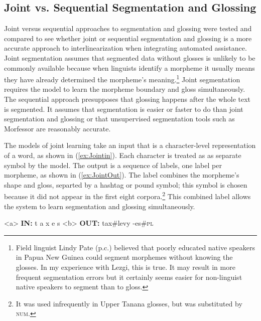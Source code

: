 

\subsection{Joint vs. Sequential Segmentation and Glossing}
\label{sec:sgjoint}

Joint versus sequential approaches to segmentation and glossing were tested and compared to see whether joint or sequential segmentation and glossing is a more accurate approach to interlinearization when integrating automated assistance. Joint segmentation assumes that segmented data without glosses is unlikely to be commonly available because when linguists identify a morpheme it usually means they have already determined the morpheme's meaning.\footnote{Field linguist Lindy Pate (p.c.) believed that poorly educated native speakers in Papua New Guinea could segment morphemes without knowing the glosses. In my experience with Lezgi, this is true. It may result in more frequent segmentation errors but it certainly seems easier for non-linguist native speakers to segment than to gloss.} 
Joint segmentation requires the model to learn the morpheme boundary and gloss simultaneously. The sequential approach presupposes that glossing happens after the whole text is segmented. It assumes that segmentation is easier or faster to do than joint segmentation and glossing or that unsupervised segmentation tools such as Morfessor \citep{smit-etal-2014-morfessor} are reasonably accurate.

The models of joint learning take an input that is a character-level representation of a word, as shown in (\ref{ex:Jointin}). Each character is treated as as separate symbol by the model. The output is a sequence of labels, one label per morpheme, as shown in (\ref{ex:JointOut}). The label combines the morpheme's shape and gloss, separted by a hashtag or pound symbol; this symbol is chosen because it did not appear in the first eight corpora.\footnote{It was used infrequently in Upper Tanana glosses, but was substituted by \textsc{num}.} This combined label allows the system to learn segmentation and glossing simultaneously. 

\pex   
\label{ex:JointInOut}
\a<a> \textbf{IN:} \hspace{6 mm} t \hspace{2 mm} a \hspace{2 mm} x \hspace{2 mm} e \hspace{2 mm} s 
\label{ex:Jointin}
\a<b> \textbf{OUT:} \hspace{2 mm} tax\#levy \hspace{3 mm} -es\#\textsc{pl} 
\label{ex:JointOut}
\xe

